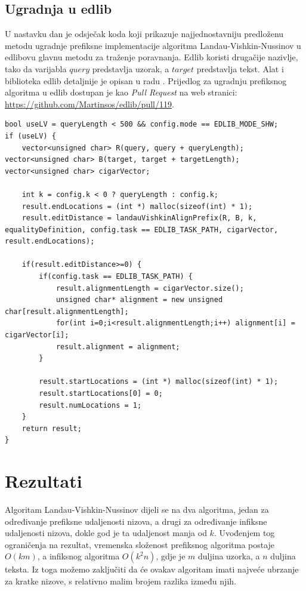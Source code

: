 \documentclass[times, utf8, zavrsni]{fer}
\begin{document}
\section{Ugradnja u edlib}
U nastavku dan je odsječak koda koji prikazuje najjednostavniju predloženu metodu ugradnje prefiksne implementacije algoritma Landau-Vishkin-Nussinov u edlibovu glavnu metodu za traženje poravnanja. Edlib koristi drugačije nazivlje, tako da varijabla $query$ predstavlja uzorak, a $target$ predstavlja tekst. Alat i biblioteka edlib detaljnije je opisan u radu \cite{edlib}. Prijedlog za ugradnju prefiksnog algoritma u edlib dostupan je kao \textit{Pull Request} na web stranici: \href{https://github.com/Martinsos/edlib/pull/119}{https://github.com/Martinsos/edlib/pull/119}.%
\newline
\begin{lstlisting}
bool useLV = queryLength < 500 && config.mode == EDLIB_MODE_SHW;
if (useLV) {
    vector<unsigned char> R(query, query + queryLength); vector<unsigned char> B(target, target + targetLength); vector<unsigned char> cigarVector;
    
    int k = config.k < 0 ? queryLength : config.k;
    result.endLocations = (int *) malloc(sizeof(int) * 1);
    result.editDistance = landauVishkinAlignPrefix(R, B, k, equalityDefinition, config.task == EDLIB_TASK_PATH, cigarVector, result.endLocations);

    if(result.editDistance>=0) {
        if(config.task == EDLIB_TASK_PATH) {
            result.alignmentLength = cigarVector.size();
            unsigned char* alignment = new unsigned char[result.alignmentLength];
            for(int i=0;i<result.alignmentLength;i++) alignment[i] = cigarVector[i];
            result.alignment = alignment;
        }

        result.startLocations = (int *) malloc(sizeof(int) * 1);
        result.startLocations[0] = 0;
        result.numLocations = 1;
    }
    return result;
}
\end{lstlisting}

\chapter{Rezultati}\label{chapter:results}
Algoritam Landau-Vishkin-Nussinov dijeli se na dva algoritma, jedan za određivanje prefiksne udaljenosti nizova, a drugi za određivanje infiksne udaljenosti nizova, dokle god je ta udaljenost manja od $k$. Uvođenjem tog ograničenja na rezultat, vremenska složenost prefiksnog algoritma postaje $O(km)$, a infiksnog algoritma $O(k^2n)$, gdje je $m$ duljina uzorka, a $n$ duljina teksta. Iz toga možemo zaključiti da će ovakav algoritam imati najveće ubrzanje za kratke nizove, s relativno malim brojem razlika između njih.
\end{document}
